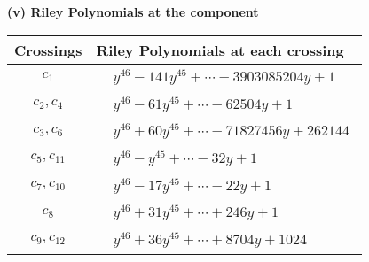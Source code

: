 \documentclass[1p]{elsarticle_modified}
\theoremstyle{definition}
\begin{document}
\flushleft \textbf{(v) Riley Polynomials at the component}\newline \\
\begin{tabular}{m{50pt}|m{274pt}}
Crossings & \hspace{64pt}Riley Polynomials at each crossing \\
\hline $$\begin{aligned}c_{1}\end{aligned}$$&$\begin{aligned}
&y^{46}-141 y^{45}+\cdots-3903085204 y+1
\end{aligned}$\\
\hline $$\begin{aligned}c_{2},c_{4}\end{aligned}$$&$\begin{aligned}
&y^{46}-61 y^{45}+\cdots-62504 y+1
\end{aligned}$\\
\hline $$\begin{aligned}c_{3},c_{6}\end{aligned}$$&$\begin{aligned}
&y^{46}+60 y^{45}+\cdots-71827456 y+262144
\end{aligned}$\\
\hline $$\begin{aligned}c_{5},c_{11}\end{aligned}$$&$\begin{aligned}
&y^{46}- y^{45}+\cdots-32 y+1
\end{aligned}$\\
\hline $$\begin{aligned}c_{7},c_{10}\end{aligned}$$&$\begin{aligned}
&y^{46}-17 y^{45}+\cdots-22 y+1
\end{aligned}$\\
\hline $$\begin{aligned}c_{8}\end{aligned}$$&$\begin{aligned}
&y^{46}+31 y^{45}+\cdots+246 y+1
\end{aligned}$\\
\hline $$\begin{aligned}c_{9},c_{12}\end{aligned}$$&$\begin{aligned}
&y^{46}+36 y^{45}+\cdots+8704 y+1024
\end{aligned}$\\
\hline
\end{tabular}\\~\\
\end{document}
